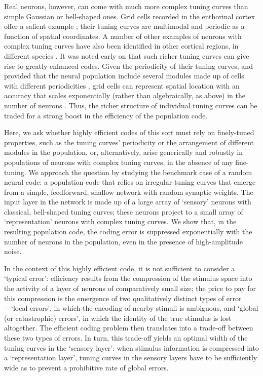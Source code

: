 \documentclass[a4paper]{article}%
\begin{document}
Real neurons, however, can come with much more complex tuning curves than
simple Gaussian or bell-shaped ones. Grid cells recorded in the enthorinal
cortex offer a salient example
\cite{Hafting2005MicrostructureCortex,Doeller2010EvidenceNetwork,Yartsev2011GridBats,Killian2012ACortex}%
; their tuning curves are multimodal and periodic as a function of spatial
coordinates. A number of other examples of neurons with complex tuning curves
have also been identified in other cortical regions, in different species
\cite{Kadia2003SpectralCharacteristics,Sofroniew2015NeuralLocomotion,Lalazar2016TuningConnectivity,Gaucher2020ComplexitySpecies,Eliav2020Multi-scaleBats}%
. It was noted early on that such richer tuning curves can give rise to
greatly enhanced codes. Given the periodicity of their tuning curves, and
provided that the neural population include several modules made up of cells
with different periodicities \cite{Fiete2008WhatLocation,Wei2015ACells}, grid
cells can represent spatial location with an accuracy that scales
exponentially (rather than algebraically, as above) in the number of neurons
\cite{Sreenivasan2011GridComputation,Mathis2012ResolutionNeurons,Burak2014SpatialCortex}%
. Thus, the richer structure of individual tuning curves can be traded for a
strong boost in the efficiency of the population code.

Here, we ask whether highly efficient codes of this sort must rely on
finely-tuned properties, such as the tuning curves' periodicity or the
arrangement of different modules in the population, or, alternatively, arise
generically and robustly in populations of neurons with complex tuning curves,
in the absence of any fine-tuning. We approach the question by studying the
benchmark case of a random neural code: a population code that relies on
irregular tuning curves that emerge from a simple, feedforward, shallow
network with random synaptic weights. The input layer in the network is made
up of a large array of `sensory' neurons with classical, bell-shaped tuning
curves; these neurons project to a small array of `representation' neurons
with complex tuning curves. We show that, in the resulting population code,
the coding error is suppressed exponentially with the number of neurons in the
population, even in the presence of high-amplitude noise.

In the context of this highly efficient code, it is not sufficient to consider
a `typical error': efficiency results from the compression of the stimulus
space into the activity of a layer of neurons of comparatively small size; the
price to pay for this compression is the emergence of two qualitatively
distinct types of error---`local errors', in which the encoding of nearby
stimuli is ambiguous, and `global (or catastrophic) errors', in which the
identity of the true stimulus is lost altogether. The efficient coding problem
then translates into a trade-off between these two types of errors. In turn,
this trade-off yields an optimal width of the tuning curves in the `sensory
layer': when stimulus information is compressed into a `representation layer',
tuning curves in the sensory layers have to be sufficiently wide as to prevent
a prohibitive rate of global errors.
\end{document}
